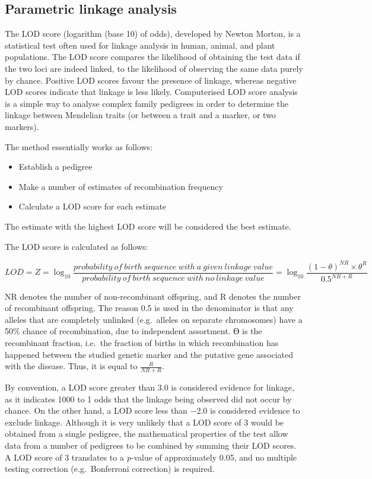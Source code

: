 \hypertarget{parametric-linkage-analysis}{%
\subsection{Parametric linkage analysis}\label{parametric-linkage-analysis}}

The LOD score (logarithm (base 10) of odds), developed by Newton Morton, is a statistical test often used for linkage analysis in human, animal, and plant populations. The LOD score compares the likelihood of obtaining the test data if the two loci are indeed linked, to the likelihood of observing the same data purely by chance. Positive LOD scores favour the presence of linkage, whereas negative LOD scores indicate that linkage is less likely. Computerised LOD score analysis is a simple way to analyse complex family pedigrees in order to determine the linkage between Mendelian traits (or between a trait and a marker, or two markers).

The method essentially works as follows:

\begin{itemize}
\tightlist
\item
  Establish a pedigree
\item
  Make a number of estimates of recombination frequency
\item
  Calculate a LOD score for each estimate
\end{itemize}

The estimate with the highest LOD score will be considered the best estimate.

The LOD score is calculated as follows:

\[LOD = Z = \log_{10}\frac{probability\ of\ birth\ sequence\ with\ a\ given\ linkage\ value}{probability\ of\ birth\ sequence\ with\ no\ linkage\ value} = \log_{10}\frac{(1-\theta)^{NR} \times \theta^R}{0.5^{NR+R}}\]

NR denotes the number of non-recombinant offspring, and R denotes the number of recombinant offspring. The reason 0.5 is used in the denominator is that any alleles that are completely unlinked (e.g.~alleles on separate chromosomes) have a 50\% chance of recombination, due to independent assortment. ϴ is the recombinant fraction, i.e.~the fraction of births in which recombination has happened between the studied genetic marker and the putative gene associated with the disease. Thus, it is equal to \(\frac{R}{NR+R}\).

By convention, a LOD score greater than 3.0 is considered evidence for linkage, as it indicates 1000 to 1 odds that the linkage being observed did not occur by chance. On the other hand, a LOD score less than −2.0 is considered evidence to exclude linkage. Although it is very unlikely that a LOD score of 3 would be obtained from a single pedigree, the mathematical properties of the test allow data from a number of pedigrees to be combined by summing their LOD scores. A LOD score of 3 translates to a \emph{p}-value of approximately 0.05, and no multiple testing correction (e.g.~Bonferroni correction) is required.

